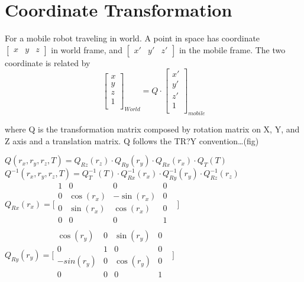 \chapter{Coordinate Transformation}

For a mobile robot traveling in world. A point in space has coordinate
$[\begin{matrix}x & y & z\end{matrix}]$ in world frame, and
$[\begin{matrix}x' & y' & z' \end{matrix}]$ in the mobile frame. The
two coordinate is related by
\begin{equation}
\begin{bmatrix}
x \\
y \\
z \\
1 \\
\end{bmatrix}_{World}=Q\cdot\begin{bmatrix}
x' \\
y' \\
z' \\
1  \\
\end{bmatrix}_{mobile}
\end{equation}


\noindent where Q is the transformation matrix composed by rotation
matrix on X, Y, and Z axis and a translation matrix. Q follows the
TR?Y convention\ldots (fig)

$Q(r_{x}, r_{y}, r_{z}, T)=Q_{Rz}(r_{z})\cdot Q_{Ry}(r_{y})\cdot 
Q_{Rx}(r_{x})\cdot Q_{T}(T)$\\


$Q^{-1}(r_{x}, r_{y}, r_{z}, T)=Q_{T}^{-1}(T)\cdot 
Q_{Rx}^{-1}(r_{x})\cdot Q_{Ry}^{-1}(r_{y})\cdot Q_{Rz}^{-1}(r_{z})$\\


$Q_{Rx}(r_{x})=\lbrack \begin{matrix}
1 & 0 & 0 & 0 & \\
0 & \cos (r_{x}) & -\sin (r_{x}) & 0 & \\
0 & \sin (r_{x}) & \cos (r_{x}) & 0 & \\
0 & 0 & 0 & 1 & \\
\end{matrix}
\rbrack $\\


$Q_{Ry}(r_{y})=\lbrack \begin{matrix}
\cos (r_{y}) & 0 & \sin (r_{y}) & 0 & \\
0 & 1 & 0 & 0 & \\
-sin(r_{y}) & 0 & \cos (r_{y}) & 0 & \\
0 & 0 & 0 & 1 & \\
\end{matrix}
\rbrack $\\


